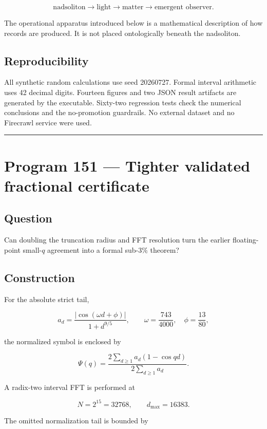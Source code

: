 \documentclass[11pt,a4paper,openany]{report}
\begin{document}
\[
\text{nadsoliton}\longrightarrow\text{light}
\longrightarrow\text{matter}
\longrightarrow\text{emergent observer}.
\]

The operational apparatus introduced below is a mathematical description of how records are produced. It is not placed ontologically beneath the nadsoliton.

\section{Reproducibility}

All synthetic random calculations use seed 20260727. Formal interval arithmetic uses 42 decimal digits. Fourteen figures and two JSON result artifacts are generated by the executable. Sixty-two regression tests check the numerical conclusions and the no-promotion guardrails. No external dataset and no Firecrawl service were used.

\par\medskip\hrule\medskip

\chapter{Program 151 --- Tighter validated fractional certificate}

\section{Question}

Can doubling the truncation radius and FFT resolution turn the earlier floating-point small-\(q\) agreement into a formal sub-\(3\%\) theorem?

\section{Construction}

For the absolute strict tail,

\[
a_d
=
\frac{|\cos(\omega d+\phi)|}{1+d^{9/5}},
\qquad
\omega=\frac{743}{4000},\quad
\phi=\frac{13}{80},
\]

the normalized symbol is enclosed by

\[
\Psi(q)
=
\frac{2\sum_{d\ge1}a_d(1-\cos qd)}
{2\sum_{d\ge1}a_d}.
\]

A radix-two interval FFT is performed at

\[
N=2^{15}=32768,\qquad d_{\max}=16383.
\]

The omitted normalization tail is bounded by
\end{document}
